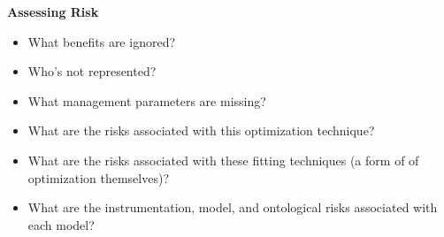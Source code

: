 \documentclass[11pt,a5paper]{book}
\begin{document}
\noindent \textbf{Assessing Risk}
\begin{itemize}
\item What benefits are ignored?
\item Who's not represented?
\item What management parameters are missing?
\item What are the risks associated with this optimization technique?
\item What are the risks associated with these fitting techniques (a form of of optimization themselves)?
\item What are the instrumentation, model, and ontological risks associated with each model?
\end{itemize}
\end{document}
